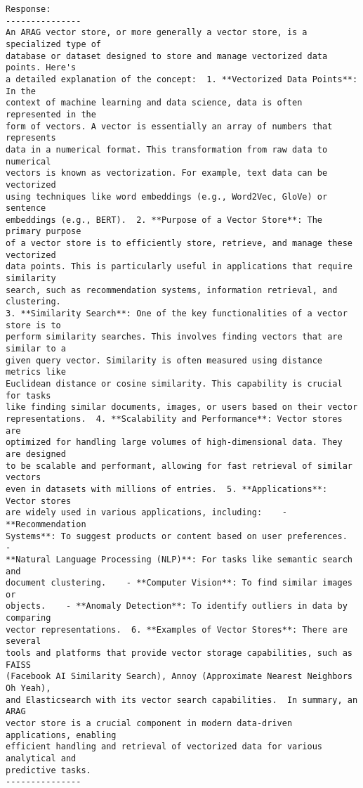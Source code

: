 \documentclass[11pt]{article}
\begin{document}
    \begin{Verbatim}[commandchars=\\\{\}]
Response:
---------------
An ARAG vector store, or more generally a vector store, is a specialized type of
database or dataset designed to store and manage vectorized data points. Here's
a detailed explanation of the concept:  1. **Vectorized Data Points**: In the
context of machine learning and data science, data is often represented in the
form of vectors. A vector is essentially an array of numbers that represents
data in a numerical format. This transformation from raw data to numerical
vectors is known as vectorization. For example, text data can be vectorized
using techniques like word embeddings (e.g., Word2Vec, GloVe) or sentence
embeddings (e.g., BERT).  2. **Purpose of a Vector Store**: The primary purpose
of a vector store is to efficiently store, retrieve, and manage these vectorized
data points. This is particularly useful in applications that require similarity
search, such as recommendation systems, information retrieval, and clustering.
3. **Similarity Search**: One of the key functionalities of a vector store is to
perform similarity searches. This involves finding vectors that are similar to a
given query vector. Similarity is often measured using distance metrics like
Euclidean distance or cosine similarity. This capability is crucial for tasks
like finding similar documents, images, or users based on their vector
representations.  4. **Scalability and Performance**: Vector stores are
optimized for handling large volumes of high-dimensional data. They are designed
to be scalable and performant, allowing for fast retrieval of similar vectors
even in datasets with millions of entries.  5. **Applications**: Vector stores
are widely used in various applications, including:    - **Recommendation
Systems**: To suggest products or content based on user preferences.    -
**Natural Language Processing (NLP)**: For tasks like semantic search and
document clustering.    - **Computer Vision**: To find similar images or
objects.    - **Anomaly Detection**: To identify outliers in data by comparing
vector representations.  6. **Examples of Vector Stores**: There are several
tools and platforms that provide vector storage capabilities, such as FAISS
(Facebook AI Similarity Search), Annoy (Approximate Nearest Neighbors Oh Yeah),
and Elasticsearch with its vector search capabilities.  In summary, an ARAG
vector store is a crucial component in modern data-driven applications, enabling
efficient handling and retrieval of vectorized data for various analytical and
predictive tasks.
---------------

    \end{Verbatim}
\end{document}
